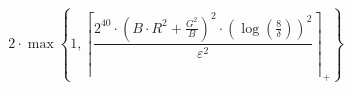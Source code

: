 \[2 \cdot \max\left\{ 1, \left\lceil \frac{2^{40} \cdot \left(B \cdot R^{2} + \frac{G^{2}}{B}\right)^{2} \cdot \left(\log\left(\frac{8}{\delta}\right)\right)^{2}}{\varepsilon^{2}} \right\rceil_{+} \right\}\]

